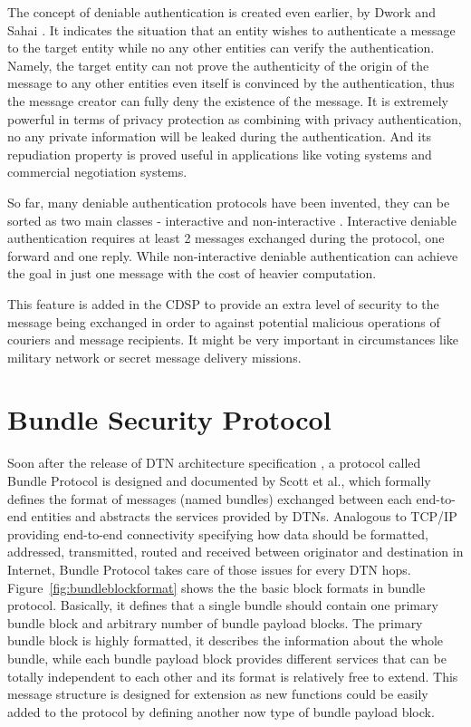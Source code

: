 The concept of deniable authentication is created even earlier, by Dwork and Sahai \cite{Dwork}. It indicates the situation that an entity wishes to authenticate a message to the target entity while no any other entities can verify the authentication. Namely, the target entity can not prove the authenticity of the origin of the message to any other entities even itself is convinced by the authentication, thus the message creator can fully deny the existence of the message. It is extremely powerful in terms of privacy protection as combining with privacy authentication, no any private information will be leaked during the authentication. And its repudiation property is proved useful in applications like voting systems and commercial negotiation systems.

So far, many deniable authentication protocols have been invented, they can be sorted as two main classes - interactive \cite{Borisov} and non-interactive \cite{Xin}\cite{Wang}\cite{Shao}. Interactive deniable authentication requires at least 2 messages exchanged during the protocol, one forward and one reply. While non-interactive deniable authentication can achieve the goal in just one message with the cost of heavier computation.

This feature is added in the CDSP to provide an extra level of security to the message being exchanged in order to against potential malicious operations of couriers and message recipients. It might be very important in circumstances like military network or secret message delivery missions.

\section{Bundle Security Protocol \cite{Symington}}
Soon after the release of DTN architecture specification \cite{Cerf}, a protocol called Bundle Protocol \cite{Scottrfc} is designed and documented by Scott et al., which formally defines the format of messages (named bundles) exchanged between each end-to-end entities and abstracts the services provided by DTNs. Analogous to TCP/IP providing end-to-end connectivity specifying how data should be formatted, addressed, transmitted, routed and received between originator and destination in Internet, Bundle Protocol takes care of those issues for every DTN hops. Figure~\ref{fig:bundleblockformat} shows the the basic block formats in bundle protocol. Basically, it defines that a single bundle should contain one primary bundle block and arbitrary number of bundle payload blocks. The primary bundle block is highly formatted, it describes the information about the whole bundle,  while each bundle payload block provides different services that can be totally independent to each other and its format is relatively free to extend. This message structure is designed for extension as new functions could be easily added to the protocol by defining another now type of bundle payload block.

